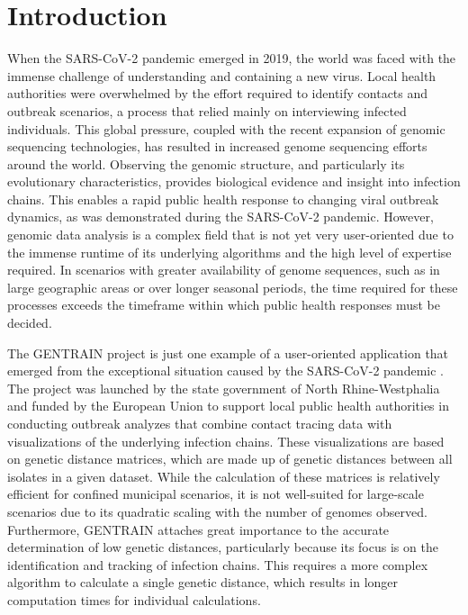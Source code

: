 \section{Introduction}
\label{cha:introduction}
When the SARS-CoV-2 pandemic emerged in 2019, the world was faced with the immense challenge of understanding and containing a new virus. Local health authorities were overwhelmed by the effort required to identify contacts and outbreak scenarios, a process that relied mainly on interviewing infected individuals.
This global pressure, coupled with the recent expansion of genomic sequencing technologies, has resulted in increased genome sequencing efforts around the world. Observing the genomic structure, and particularly its evolutionary characteristics, provides biological evidence and insight into infection chains. This enables a rapid public health response to changing viral outbreak dynamics, as was demonstrated during the SARS-CoV-2 pandemic. However, genomic data analysis is a complex field that is not yet very user-oriented due to the immense runtime of its underlying algorithms and the high level of expertise required. In scenarios with greater availability of genome sequences, such as in large geographic areas or over longer seasonal periods, the time required for these processes exceeds the timeframe within which public health responses must be decided.

The GENTRAIN project is just one example of a user-oriented application that emerged from the exceptional situation caused by the SARS-CoV-2 pandemic \cite{Fra1}. The project was launched by the state government of North Rhine-Westphalia and funded by the European Union to support local public health authorities in conducting outbreak analyzes that combine contact tracing data with visualizations of the underlying infection chains. These visualizations are based on genetic distance matrices, which are made up of genetic distances between all isolates in a given dataset. While the calculation of these matrices is relatively efficient for confined municipal scenarios, it is not well-suited for large-scale scenarios due to its quadratic scaling with the number of genomes observed. Furthermore, GENTRAIN attaches great importance to the accurate determination of low genetic distances, particularly because its focus is on the identification and tracking of infection chains. This requires a more complex algorithm to calculate a single genetic distance, which results in longer computation times for individual calculations.

